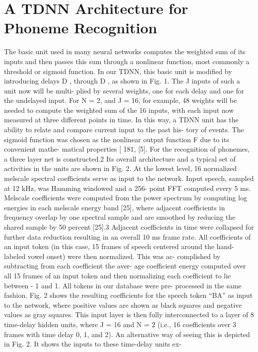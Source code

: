 \section{A TDNN Architecture for Phoneme Recognition}
The basic unit used in many neural networks computes the weighted sum of its inputs and then passes this sum through a nonlinear function, most commonly a threshold or sigmoid function. In our TDNN, this basic unit is modified by introducing delays D , through D , as shown in Fig. 1. The J inputs of such a unit now will be multi- plied by several weights, one for each delay and one for
the undelayed input. For N = 2, and J = 16, for example,
48 weights will be needed to compute the weighted sum
of the 16 inputs, with each input now measured at three
different points in time. In this way, a TDNN unit has the
ability to relate and compare current input to the past his-
tory of events. The sigmoid function was chosen as the
nonlinear output function F due to its convenient mathe-
matical properties [ 181, [5].
For the recognition of phonemes, a three layer net is
constructed.2 Its overall architecture and a typical set of
activities in the units are shown in Fig. 2.
At the lowest level, 16 normalized melscale spectral
coefficients serve as input to the network. Input speech,
sampled at 12 kHz, was Hamming windowed and a 256-
point FFT computed every 5 ms. Melscale coefficients
were computed from the power spectrum by computing
log energies in each melscale energy band [25], where
adjacent coefficients in frequency overlap by one spectral
sample and are smoothed by reducing the shared sample
by 50 percent [25].3 Adjacent coefficients in time were
collapsed for further data reduction resulting in an overall
10 ms frame rate. All coefficients of an input token (in
this case, 15 frames of speech centered around the hand-
labeled vowel onset) were then normalized. This was ac-
complished by subtracting from each coefficient the aver-
age coefficient energy computed over all 15 frames of an
input token and then normalizing each coefficient to lie
between - 1 and 1. All tokens in our database were pre-
processed in the same fashion. Fig. 2 shows the resulting
coefficients for the speech token “BA” as input to the
network, where positive values are shown as black squares
and negative values as gray squares.
This input layer is then fully interconnected to a layer
of 8 time-delay hidden units, where J = 16 and N = 2
(i.e., 16 coefficients over 3 frames with time delay 0, 1,
and 2). An alternative way of seeing this is depicted in
Fig. 2. It shows the inputs to these time-delay units ex-
